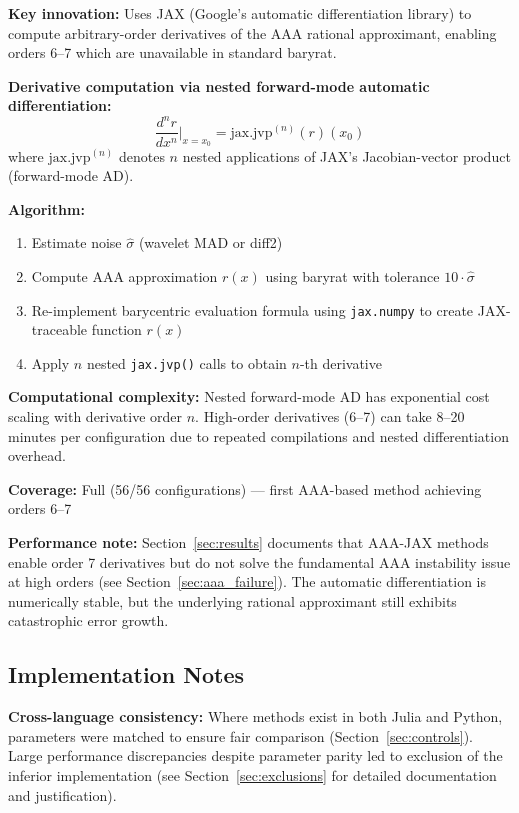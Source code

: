 \textbf{Key innovation:} Uses JAX (Google's automatic differentiation library) to compute arbitrary-order derivatives of the AAA rational approximant, enabling orders 6--7 which are unavailable in standard baryrat.

\textbf{Derivative computation via nested forward-mode automatic differentiation:}
\begin{equation}
\frac{d^n r}{dx^n}\bigg|_{x=x_0} = \text{jax.jvp}^{(n)}(r)(x_0)
\end{equation}
where $\text{jax.jvp}^{(n)}$ denotes $n$ nested applications of JAX's Jacobian-vector product (forward-mode AD).

\textbf{Algorithm:}
\begin{enumerate}
    \item Estimate noise $\hat{\sigma}$ (wavelet MAD or diff2)
    \item Compute AAA approximation $r(x)$ using baryrat with tolerance $10 \cdot \hat{\sigma}$
    \item Re-implement barycentric evaluation formula using \texttt{jax.numpy} to create JAX-traceable function $r(x)$
    \item Apply $n$ nested \texttt{jax.jvp()} calls to obtain $n$-th derivative
\end{enumerate}

\textbf{Computational complexity:} Nested forward-mode AD has exponential cost scaling with derivative order $n$. High-order derivatives (6--7) can take 8--20 minutes per configuration due to repeated compilations and nested differentiation overhead.

\textbf{Coverage:} Full (56/56 configurations) --- first AAA-based method achieving orders 6--7

\textbf{Performance note:} Section~\ref{sec:results} documents that AAA-JAX methods enable order 7 derivatives but do not solve the fundamental AAA instability issue at high orders (see Section~\ref{sec:aaa_failure}). The automatic differentiation is numerically stable, but the underlying rational approximant still exhibits catastrophic error growth.

\subsection{Implementation Notes}
\label{sec:implementation_notes}

\textbf{Cross-language consistency:} Where methods exist in both Julia and Python, parameters were matched to ensure fair comparison (Section~\ref{sec:controls}). Large performance discrepancies despite parameter parity led to exclusion of the inferior implementation (see Section~\ref{sec:exclusions} for detailed documentation and justification).

